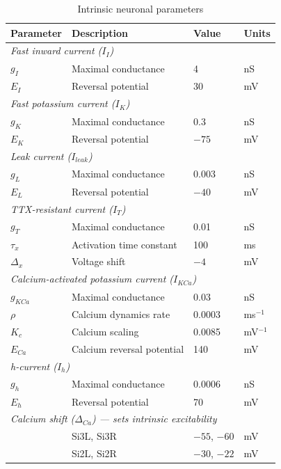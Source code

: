 \begin{table}[htbp]
\centering
\caption{Intrinsic neuronal parameters}
\label{tab:intrinsic_params}
\begin{tabular}{|l|l|l|l|}
\hline
\textbf{Parameter} & \textbf{Description} & \textbf{Value} & \textbf{Units} \\
\hline
\multicolumn{4}{|l|}{\textit{Fast inward current ($I_I$)}} \\
\hline
$g_I$ & Maximal conductance & 4 & nS \\
$E_I$ & Reversal potential & 30 & mV \\
\hline
\multicolumn{4}{|l|}{\textit{Fast potassium current ($I_K$)}} \\
\hline
$g_K$ & Maximal conductance & 0.3 & nS \\
$E_K$ & Reversal potential & $-75$ & mV \\
\hline
\multicolumn{4}{|l|}{\textit{Leak current ($I_{leak}$)}} \\
\hline
$g_L$ & Maximal conductance & 0.003 & nS \\
$E_L$ & Reversal potential & $-40$ & mV \\
\hline
\multicolumn{4}{|l|}{\textit{TTX-resistant current ($I_T$)}} \\
\hline
$g_T$ & Maximal conductance & 0.01 & nS \\
$\tau_x$ & Activation time constant & 100 & ms \\
$\Delta_x$ & Voltage shift & $-4$ & mV \\
\hline
\multicolumn{4}{|l|}{\textit{Calcium-activated potassium current ($I_{KCa}$)}} \\
\hline
$g_{KCa}$ & Maximal conductance & 0.03 & nS \\
$\rho$ & Calcium dynamics rate & 0.0003 & ms$^{-1}$ \\
$K_c$ & Calcium scaling & 0.0085 & mV$^{-1}$ \\
$E_{Ca}$ & Calcium reversal potential & 140 & mV \\
\hline
\multicolumn{4}{|l|}{\textit{h-current ($I_h$)}} \\
\hline
$g_h$ & Maximal conductance & 0.0006 & nS \\
$E_h$ & Reversal potential & 70 & mV \\
\hline
\multicolumn{4}{|l|}{\textit{Calcium shift ($\Delta_{Ca}$) --- sets intrinsic excitability}} \\
\hline
 & Si3L, Si3R & $-55$, $-60$ & mV \\
 & Si2L, Si2R & $-30$, $-22$ & mV \\
\hline
\end{tabular}
\end{table}

